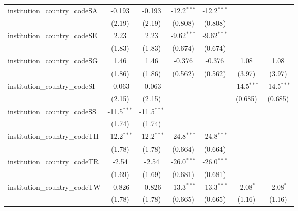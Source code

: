 \begin{tabular}{lcccccc}
   institution\_country\_codeSA          & -0.193        & -0.193        & -12.2$^{***}$ & -12.2$^{***}$ &               &   \\   
                                         & (2.19)        & (2.19)        & (0.808)       & (0.808)       &               &   \\   
   institution\_country\_codeSE          & 2.23          & 2.23          & -9.62$^{***}$ & -9.62$^{***}$ &               &   \\   
                                         & (1.83)        & (1.83)        & (0.674)       & (0.674)       &               &   \\   
   institution\_country\_codeSG          & 1.46          & 1.46          & -0.376        & -0.376        & 1.08          & 1.08\\   
                                         & (1.86)        & (1.86)        & (0.562)       & (0.562)       & (3.97)        & (3.97)\\   
   institution\_country\_codeSI          & -0.063        & -0.063        &               &               & -14.5$^{***}$ & -14.5$^{***}$\\   
                                         & (2.15)        & (2.15)        &               &               & (0.685)       & (0.685)\\   
   institution\_country\_codeSS          & -11.5$^{***}$ & -11.5$^{***}$ &               &               &               &   \\   
                                         & (1.74)        & (1.74)        &               &               &               &   \\   
   institution\_country\_codeTH          & -12.2$^{***}$ & -12.2$^{***}$ & -24.8$^{***}$ & -24.8$^{***}$ &               &   \\   
                                         & (1.78)        & (1.78)        & (0.664)       & (0.664)       &               &   \\   
   institution\_country\_codeTR          & -2.54         & -2.54         & -26.0$^{***}$ & -26.0$^{***}$ &               &   \\   
                                         & (1.69)        & (1.69)        & (0.681)       & (0.681)       &               &   \\   
   institution\_country\_codeTW          & -0.826        & -0.826        & -13.3$^{***}$ & -13.3$^{***}$ & -2.08$^{*}$   & -2.08$^{*}$\\   
                                         & (1.78)        & (1.78)        & (0.665)       & (0.665)       & (1.16)        & (1.16)\\   

\end{tabular}
